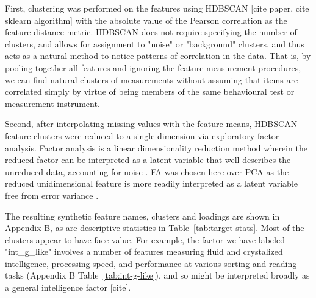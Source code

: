 \documentclass{article}
\begin{document}


First, clustering was performed on the features using HDBSCAN [cite
paper, cite sklearn algorithm] with the absolute value of the Pearson
correlation as the feature distance metric. HDBSCAN does not require
specifying the number of clusters, and allows for assignment to "noise" or
"background" clusters, and thus acts as a natural method to notice patterns
of correlation in the data. That is, by pooling together all features and
ignoring the feature measurement procedures, we can find natural clusters of measurements
without assuming that items are correlated simply by virtue of being members
of the same behavioural test or measurement instrument.

Second, after interpolating missing values with the feature means, HDBSCAN
feature clusters were reduced to a single dimension via exploratory factor
analysis. Factor analysis is a linear dimensionality reduction method wherein
the reduced factor can be interpreted as a latent variable that
well-describes the unreduced data, accounting for noise
\citep{cattellScientificUseFactor1978,childEssentialsFactorAnalysis2006a}. FA
was chosen here over PCA as the reduced unidimensional feature is more
readily interpreted as a latent variable free from error variance
\cite{attiasIndependentFactorAnalysis1999}.

The resulting synthetic feature names, clusters and loadings are shown in
\hyperref[sec:appendix-b]{Appendix B}, as are descriptive statistics in Table~\ref{tab:target-stats}.
Most of the clusters appear to have face value. For example, the factor we
have labeled "int\_g\_like" involves a number of features measuring fluid and
crystalized intelligence, processing speed, and performance at various
sorting and reading tasks (Appendix B Table~\ref{tab:int-g-like}), and so
might be interpreted broadly as a general intelligence factor [cite].
\end{document}
